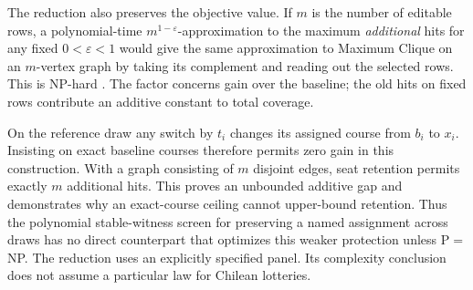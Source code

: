 The reduction also preserves the objective value. If $m$ is the number of editable rows, a polynomial-time $m^{1-\varepsilon}$-approximation to the maximum \emph{additional} hits for any fixed $0<\varepsilon<1$ would give the same approximation to Maximum Clique on an $m$-vertex graph by taking its complement and reading out the selected rows. This is NP-hard \citep{zuckerman2007}. The factor concerns gain over the baseline; the old hits on fixed rows contribute an additive constant to total coverage.

On the reference draw any switch by $t_i$ changes its assigned course from
$b_i$ to $x_i$. Insisting on exact baseline courses therefore permits zero
gain in this construction. With a graph consisting of $m$ disjoint edges,
seat retention permits exactly $m$ additional hits. This proves an unbounded
additive gap and demonstrates why an exact-course ceiling cannot upper-bound
retention. Thus the polynomial stable-witness screen for preserving a named assignment across draws has no direct counterpart that optimizes this weaker protection unless P$=$NP. The reduction uses an explicitly specified panel. Its complexity
conclusion does not assume a particular law for Chilean lotteries.
